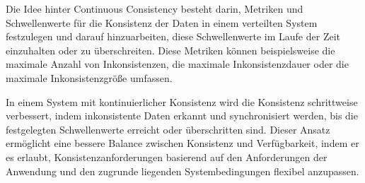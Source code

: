 \documentclass[../vs-script-first-v01.tex]{subfiles}
\begin{document}
Die Idee hinter Continuous Consistency besteht darin, Metriken und Schwellenwerte für die Konsistenz der Daten in einem verteilten System festzulegen und darauf hinzuarbeiten, diese Schwellenwerte im Laufe der Zeit einzuhalten oder zu überschreiten. Diese Metriken können beispielsweise die maximale Anzahl von Inkonsistenzen, die maximale Inkonsistenzdauer oder die maximale Inkonsistenzgröße umfassen.

In einem System mit kontinuierlicher Konsistenz wird die Konsistenz schrittweise verbessert, indem inkonsistente Daten erkannt und synchronisiert werden, bis die festgelegten Schwellenwerte erreicht oder überschritten sind. Dieser Ansatz ermöglicht eine bessere Balance zwischen Konsistenz und Verfügbarkeit, indem er es erlaubt, Konsistenzanforderungen basierend auf den Anforderungen der Anwendung und den zugrunde liegenden Systembedingungen flexibel anzupassen.
\end{document}
